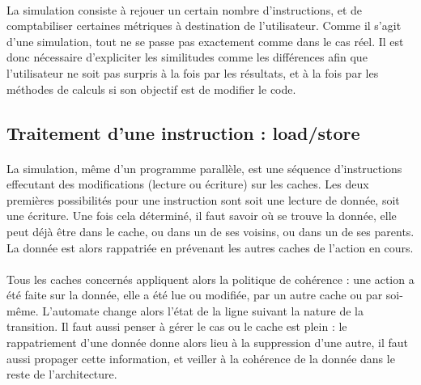 \paragraph{}
La simulation consiste à rejouer un certain nombre d'instructions, et de comptabiliser certaines métriques à destination de l'utilisateur. Comme il s'agit d'une simulation, tout ne se passe pas exactement comme dans le cas réel. Il est donc nécessaire d'expliciter les similitudes comme les différences afin que l'utilisateur ne soit pas surpris à la fois par les résultats, et à la fois par les méthodes de calculs si son objectif est de modifier le code.

\subsection{Traitement d'une instruction : load/store}

\paragraph{}
La simulation, même d'un programme parallèle, est une séquence d'instructions effecutant des modifications (lecture ou écriture) sur les caches. Les deux premières possibilités pour une instruction sont soit une lecture de donnée, soit une écriture. Une fois cela déterminé, il faut savoir où se trouve la donnée, elle peut déjà être dans le cache, ou dans un de ses voisins, ou dans un de ses parents. La donnée est alors rappatriée en prévenant les autres caches de l'action en cours. 

\paragraph{}
Tous les caches concernés appliquent alors la politique de cohérence : une action a été faite sur la donnée, elle a été lue ou modifiée, par un autre cache ou par soi-même. L'automate change alors l'état de la ligne suivant la nature de la transition. Il faut aussi penser à gérer le cas ou le cache est plein : le rappatriement d'une donnée donne alors lieu à la suppression d'une autre, il faut aussi propager cette information, et veiller à la cohérence de la donnée dans le reste de l'architecture.

